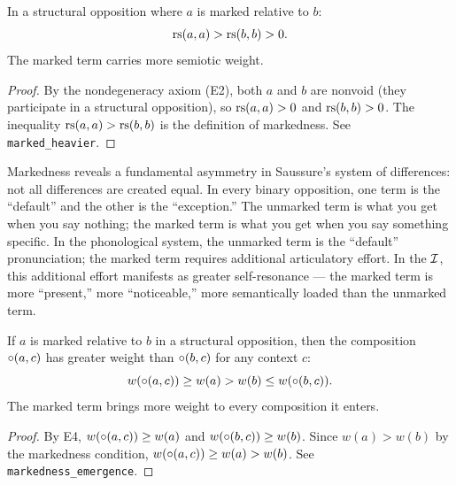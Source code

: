 \begin{theorem}
\label{thm:marked-heavier}
In a structural opposition where $a$ is marked relative to $b$:
\[
  \mathrm{rs}(a, a) > \mathrm{rs}(b, b) > 0.
\]
The marked term carries more semiotic weight.
\end{theorem}

\begin{proof}
By the nondegeneracy axiom (E2), both $a$ and $b$ are nonvoid (they
participate in a structural opposition), so $\mathrm{rs}(a,a) > 0$ and
$\mathrm{rs}(b,b) > 0$. The inequality $\mathrm{rs}(a,a) > \mathrm{rs}(b,b)$ is the
definition of markedness. See \texttt{marked\_heavier}.
\end{proof}

\begin{interpretation}
Markedness reveals a fundamental asymmetry in Saussure's system of
differences: not all differences are created equal. In every binary
opposition, one term is the ``default'' and the other is the
``exception.'' The unmarked term is what you get when you say
nothing; the marked term is what you get when you say something
specific. In the phonological system, the unmarked term is the
``default'' pronunciation; the marked term requires additional
articulatory effort. In the $\mathcal{I}$, this additional effort manifests
as greater self-resonance --- the marked term is more ``present,''
more ``noticeable,'' more semantically loaded than the unmarked term.
\end{interpretation}

\begin{theorem}
\label{thm:markedness-emergence}
If $a$ is marked relative to $b$ in a structural opposition, then the composition $\circ(a, c)$ has greater weight than $\circ(b, c)$ for any context $c$:
\[
  w(\circ(a, c)) \geq w(a) > w(b) \leq w(\circ(b, c)).
\]
The marked term brings more weight to every composition it enters.
\end{theorem}

\begin{proof}
By E4, $w(\circ(a, c)) \geq w(a)$ and $w(\circ(b, c)) \geq w(b)$. Since $w(a) > w(b)$ by the markedness condition, $w(\circ(a, c)) \geq w(a) > w(b)$. See \texttt{markedness\_emergence}.
\end{proof}

